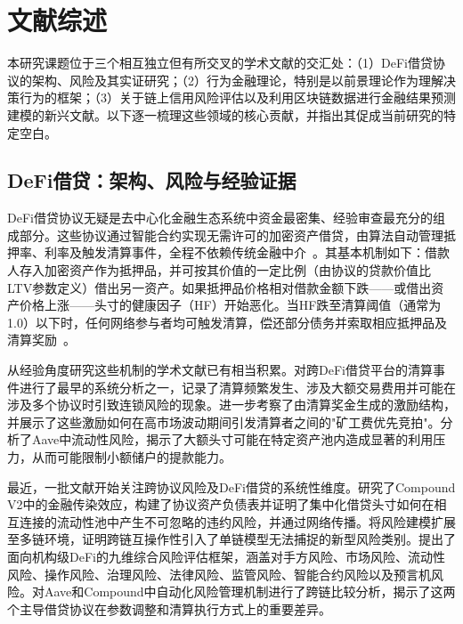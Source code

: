 \section{文献综述}

本研究课题位于三个相互独立但有所交叉的学术文献的交汇处：（1）DeFi借贷协议的架构、风险及其实证研究；（2）行为金融理论，特别是以前景理论作为理解决策行为的框架；（3）关于链上信用风险评估以及利用区块链数据进行金融结果预测建模的新兴文献。以下逐一梳理这些领域的核心贡献，并指出其促成当前研究的特定空白。

\subsection{DeFi借贷：架构、风险与经验证据}

DeFi借贷协议无疑是去中心化金融生态系统中资金最密集、经验审查最充分的组成部分。这些协议通过智能合约实现无需许可的加密资产借贷，由算法自动管理抵押率、利率及触发清算事件，全程不依赖传统金融中介~\cite{schar2021decentralized2}。其基本机制如下：借款人存入加密资产作为抵押品，并可按其价值的一定比例（由协议的贷款价值比LTV参数定义）借出另一资产。如果抵押品价格相对借款金额下跌——或借出资产价格上涨——头寸的健康因子（HF）开始恶化。当HF跌至清算阈值（通常为1.0）以下时，任何网络参与者均可触发清算，偿还部分债务并索取相应抵押品及清算奖励~\cite{perez2020liquidations, qin2021empirical}。

从经验角度研究这些机制的学术文献已有相当积累。\citet{perez2020liquidations}对跨DeFi借贷平台的清算事件进行了最早的系统分析之一，记录了清算频繁发生、涉及大额交易费用并可能在涉及多个协议时引致连锁风险的现象。\citet{qin2021empirical}进一步考察了由清算奖金生成的激励结构，并展示了这些激励如何在高市场波动期间引发清算者之间的"矿工费优先竞拍"。\citet{sun2022liquidity}分析了Aave中流动性风险，揭示了大额头寸可能在特定资产池内造成显著的利用压力，从而可能限制小额储户的提款能力。

最近，一批文献开始关注跨协议风险及DeFi借贷的系统性维度。\citet{tovanich2023contagion}研究了Compound V2中的金融传染效应，构建了协议资产负债表并证明了集中化借贷头寸如何在相互连接的流动性池中产生不可忽略的违约风险，并通过网络传播。\citet{sevim2026interoperability}将风险建模扩展至多链环境，证明跨链互操作性引入了单链模型无法捕捉的新型风险类别。\citet{oberholzer2026toward}提出了面向机构级DeFi的九维综合风险评估框架，涵盖对手方风险、市场风险、流动性风险、操作风险、治理风险、法律风险、监管风险、智能合约风险以及预言机风险。\citet{iftikhar2025automated}对Aave和Compound中自动化风险管理机制进行了跨链比较分析，揭示了这两个主导借贷协议在参数调整和清算执行方式上的重要差异。

